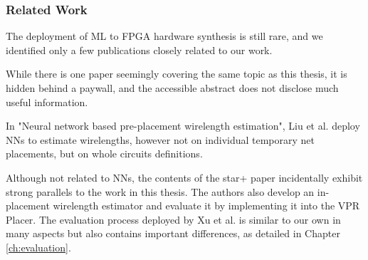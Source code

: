 \subsubsection{Related Work}

The deployment of \gls{ML} to \gls{FPGA} hardware synthesis is still rare\cite{routability-estimator}, and we identified only a few publications closely related to our work. 

While there is one paper seemingly covering the same topic as this thesis, it is hidden behind a paywall, and the accessible abstract does not disclose much useful information.\cite{doi:10.1142/S0218213098000202}

In "Neural network based pre-placement wirelength estimation"\cite{pre-placement-estimation}, Liu et al. deploy \glspl{NN} to estimate wirelengths, however not on individual temporary net placements, but on whole circuits definitions.

Although not related to \glspl{NN}, the contents of the star+ paper incidentally exhibit strong parallels to the work in this thesis. The authors also develop an in-placement wirelength estimator and evaluate it by implementing it into the \gls{VPR} Placer. The evaluation process deployed by Xu et al. is similar to our own in many aspects but also contains important differences, as detailed in Chapter \ref{ch:evaluation}.

